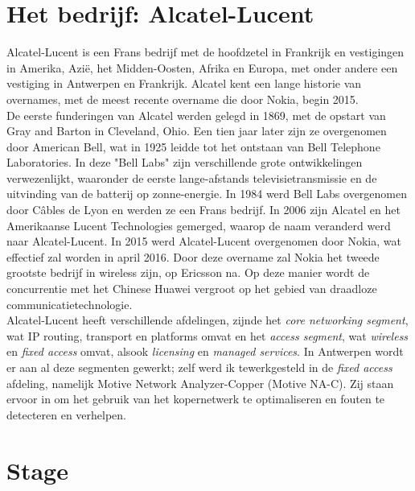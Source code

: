 \documentclass[10pt,a4paper]{article}
\begin{document}
\section{Het bedrijf: Alcatel-Lucent}
\label{bedrijf}
Alcatel-Lucent is een Frans bedrijf met de hoofdzetel in Frankrijk en vestigingen in Amerika, Azi\"e, het Midden-Oosten, Afrika en Europa, met onder andere een vestiging in Antwerpen en Frankrijk. Alcatel kent een lange historie van overnames, met de meest recente overname die door Nokia, begin 2015.\\
De eerste funderingen van Alcatel werden gelegd in 1869, met de opstart van Gray and Barton in Cleveland, Ohio. Een tien jaar later zijn ze overgenomen door American Bell, wat in 1925 leidde tot het ontstaan van Bell Telephone Laboratories. In deze "Bell Labs" zijn verschillende grote ontwikkelingen verwezenlijkt, waaronder de eerste lange-afstands televisietransmissie en de uitvinding van de batterij op zonne-energie.  In 1984 werd Bell Labs overgenomen door C\^ables de Lyon en werden ze een Frans bedrijf. In 2006 zijn Alcatel en het Amerikaanse Lucent Technologies gemerged, waarop de naam veranderd werd naar Alcatel-Lucent. In 2015 werd Alcatel-Lucent overgenomen door Nokia, wat effectief zal worden in april 2016. Door deze overname zal Nokia het tweede grootste bedrijf in wireless zijn, op Ericsson na. Op deze manier wordt de concurrentie met het Chinese Huawei vergroot op het gebied van draadloze communicatietechnologie.\\
Alcatel-Lucent heeft verschillende afdelingen, zijnde het \textit{core networking segment}, wat IP routing, transport en platforms omvat en het \textit{access segment}, wat \textit{wireless} en \textit{fixed access} omvat, alsook \textit{licensing} en \textit{managed services}. In Antwerpen wordt er aan al deze segmenten gewerkt; zelf werd ik tewerkgesteld in de \textit{fixed access} afdeling, namelijk Motive Network Analyzer-Copper (Motive NA-C). Zij staan ervoor in om het gebruik van het kopernetwerk te optimaliseren en fouten te detecteren en verhelpen.\\ 

\section{Stage}
\label{stage}
\end{document}
